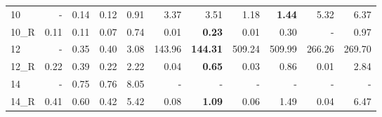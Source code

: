 \documentclass[3p,authoryear,times]{elsarticle}
\newcommand{\rmin}[0]{{\Rightarrow_{red}}}
\newcommand{\enc}[0]{\Leftrightarrow_{enc}}
\begin{document}
{\begin{table}[hbt!]
\begin{center}
\begin{footnotesize}
\begin{tabular}{|l | r |r| r| r| r| r| r| r| r| r|}
\hline
10 	&-		&0.14		&0.12	&0.91		&3.37	&3.51	&1.18	&\textbf{1.44}	&5.32	&6.37\\
10\_R 	&0.11		&0.11		&0.07	&0.74		&0.01	&{\textbf{0.23}	}	&0.01	&0.30	&-	&0.97\\
\hline
12 	&-		&0.35		&0.40	&3.08		&143.96	&\textbf{144.31}	&509.24	&509.99	&266.26	&269.70\\
12\_R 	&0.22	&0.39		&0.22	&2.22		&0.04	&{\textbf{0.65}}	&0.03	&0.86	&0.01	&2.84\\
\hline
14 	&-		&0.75	&0.76	&8.05	& - 	&-	& - 	&-	& - 	&-\\
14\_R	&0.41	&0.60	&0.42	&5.42	&0.08	&{\textbf{1.09}	}&0.06	&1.49	&0.04	&6.47\\
\hline
\end{tabular}
\end{footnotesize}
\end{center}
\end{table}
}
\end{document}
